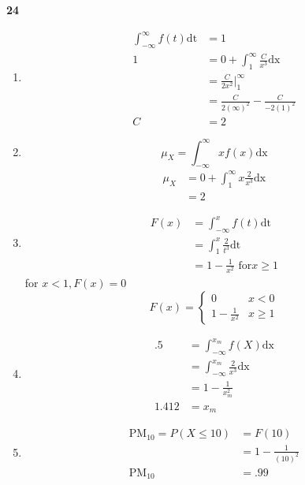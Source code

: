 \documentclass[12pt]{report}
\begin{document}
{\bf 24}%
\begin{enumerate}[label={\bf \alph*}]
\item 
\begin{align*}
\int_{-\infty}^\infty f(t) \text{dt} &= 1 \\
1&=0+\int_1^\infty \frac{C}{x^3} \text{dx}\\
&=\frac{C}{2x^2} \bigg\rvert_1^{\infty}\\
&=\frac{C}{2(\infty)^2}-\frac{C}{-2(1)^2}\\
C&=2
\end{align*}
\item
$$\mu_X= \int_{-\infty}^{\infty} x f(x)\text{dx}$$
\begin{align*}
\mu_X &= 0+\int_{1}^{\infty} x \frac{2}{x^3} \text{dx}\\
      &= 2
\end{align*}
\item
\begin{align*}
F(x) &= \int_{-\infty}^x f(t) \text{dt}\\
&=\int_{1}^x \frac{2}{t^3} \text{dt}\\
&=1-\frac{1}{x^2}\text{ for} x\geq 1  
\end{align*}
for $x < 1, F(x) =0$
$$ F(x) = 
   \begin{cases*}
      0 &x<0\\
      1-\frac{1}{x^2} & x \geq 1
   \end{cases*}
   $$
\item
\begin{align*}
.5 &= \int_{-\infty}^{x_m} f(X) \text{dx}\\
   &=  \int_{-\infty}^{x_m} \frac{2}{x^3} \text{dx}\\
   &= 1-\frac{1}{x_m^2}\\
1.412&=x_m
\end{align*}
\item
\begin{align*}
\text{PM}_{10}=P(X \leq 10) &= F(10)\\
&=1-\frac{1}{(10)^2}\\
\text{PM}_{10}&=.99
\end{align*}
\end{enumerate}
 
\end{document}
